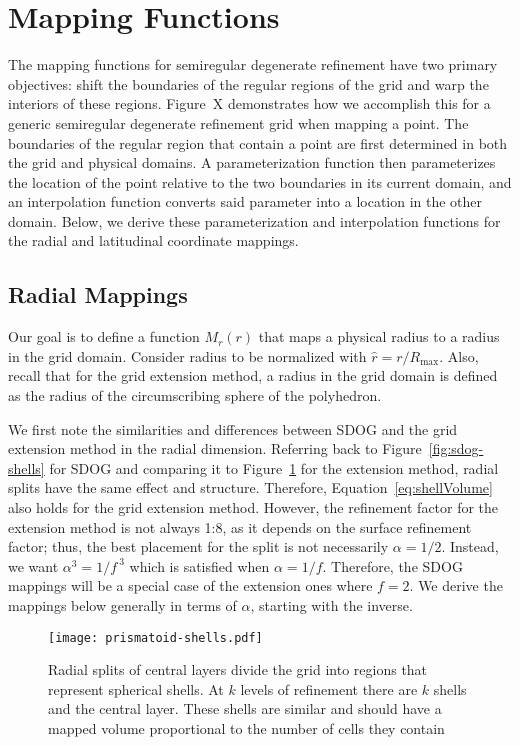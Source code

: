 \section{Mapping Functions} \label{chap:6:functions}
The mapping functions for semiregular degenerate refinement have two primary objectives: shift the boundaries of the regular regions of the grid and warp the interiors of these regions.
Figure~X demonstrates how we accomplish this for a generic semiregular degenerate refinement grid when mapping a point.
The boundaries of the regular region that contain a point are first determined in both the grid and physical domains.
A parameterization function then parameterizes the location of the point relative to the two boundaries in its current domain, and an interpolation function converts said parameter into a location in the other domain.
Below, we derive these parameterization and interpolation functions for the radial and latitudinal coordinate mappings.


\subsection{Radial Mappings} \label{chap:6:radial}
Our goal is to define a function $M_r(r)$ that maps a physical radius to a radius in the grid domain.
Consider radius to be normalized with $\hat{r} = r / R_\mathrm{max}$.
Also, recall that for the grid extension method, a radius in the grid domain is defined as the radius of the circumscribing sphere of the polyhedron.


We first note the similarities and differences between SDOG and the grid extension method in the radial dimension.
Referring back to Figure~\ref{fig:sdog-shells} for SDOG and comparing it to Figure~\ref{fig:prismatoid-shells} for the extension method, radial splits have the same effect and structure.
Therefore, Equation~\ref{eq:shellVolume} also holds for the grid extension method.
However, the refinement factor for the extension method is not always 1:8, as it depends on the surface refinement factor; thus, the best placement for the split is not necessarily $\alpha = 1/2$.
Instead, we want $\alpha^3 = 1 / f^{\ 3}$ which is satisfied when $\alpha = 1/f$.
Therefore, the SDOG mappings will be a special case of the extension ones where $f = 2$.
We derive the mappings below generally in terms of $\alpha$, starting with the inverse.


\begin{figure}[ht!]
	\centering
	\texttt{[image: prismatoid-shells.pdf]}
	\caption[Spherical shells that result from the grid extension method]{
		Radial splits of central layers divide the grid into regions that represent spherical shells.
		At $k$ levels of refinement there are $k$ shells and the central layer.
		These shells are similar and should have a mapped volume proportional to the number of cells they contain
	}
	\label{fig:prismatoid-shells}
\end{figure}

